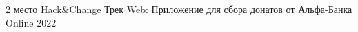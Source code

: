 



\begin{cvhonors}

  \cvhonor
    {2 место} %
    {Hack\&Change Трек Web: Приложение для сбора донатов от Альфа-Банка} %
    {Online} %
    {2022} %

\end{cvhonors}

